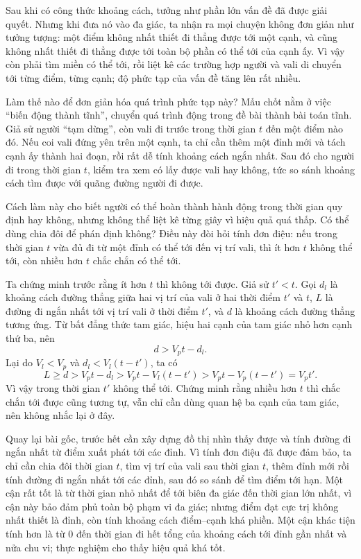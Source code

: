 \documentclass[11pt]{article}
\begin{document}
Sau khi có công thức khoảng cách, tưởng như phần lớn vấn đề đã được giải
quyết. Nhưng khi đưa nó vào đa giác, ta nhận ra mọi chuyện không đơn giản như
tưởng tượng: một điểm không nhất thiết đi thẳng được tới một cạnh, và cũng
không nhất thiết đi thẳng được tới toàn bộ phần có thể tới của cạnh ấy. Vì
vậy còn phải tìm miền có thể tới, rồi liệt kê các trường hợp người và vali di
chuyển tới từng điểm, từng cạnh; độ phức tạp của vấn đề tăng lên rất nhiều.

Làm thế nào để đơn giản hóa quá trình phức tạp này? Mấu chốt nằm ở việc
``biến động thành tĩnh'', chuyển quá trình động trong đề bài thành bài toán
tĩnh. Giả sử người ``tạm dừng'', còn vali đi trước trong thời gian \(t\) đến
một điểm nào đó. Nếu coi vali đứng yên trên một cạnh, ta chỉ cần thêm một đỉnh
mới và tách cạnh ấy thành hai đoạn, rồi rất dễ tính khoảng cách ngắn nhất.
Sau đó cho người đi trong thời gian \(t\), kiểm tra xem có lấy được vali hay
không, tức so sánh khoảng cách tìm được với quãng đường người đi được.

Cách làm này cho biết người có thể hoàn thành hành động trong thời gian quy
định hay không, nhưng không thể liệt kê từng giây vì hiệu quả quá thấp. Có
thể dùng chia đôi để phán định không? Điều này đòi hỏi tính đơn điệu: nếu
trong thời gian \(t\) vừa đủ đi từ một đỉnh có thể tới đến vị trí vali, thì ít
hơn \(t\) không thể tới, còn nhiều hơn \(t\) chắc chắn có thể tới.

Ta chứng minh trước rằng ít hơn \(t\) thì không tới được. Giả sử
\(t'<t\). Gọi \(d_l\) là khoảng cách đường thẳng giữa hai vị trí của vali ở
hai thời điểm \(t'\) và \(t\), \(L\) là đường đi ngắn nhất tới vị trí vali ở
thời điểm \(t'\), và \(d\) là khoảng cách đường thẳng tương ứng. Từ bất đẳng
thức tam giác, hiệu hai cạnh của tam giác nhỏ hơn cạnh thứ ba, nên
\[
  d>V_p t-d_l.
\]
Lại do \(V_l<V_p\) và \(d_l<V_l(t-t')\), ta có
\[
  L\ge d>V_p t-d_l>V_p t-V_l(t-t')>V_p t-V_p(t-t')=V_p t'.
\]
Vì vậy trong thời gian \(t'\) không thể tới. Chứng minh rằng nhiều hơn \(t\)
thì chắc chắn tới được cũng tương tự, vẫn chỉ cần dùng quan hệ ba cạnh của tam
giác, nên không nhắc lại ở đây.

Quay lại bài gốc, trước hết cần xây dựng đồ thị nhìn thấy được và tính đường
đi ngắn nhất từ điểm xuất phát tới các đỉnh. Vì tính đơn điệu đã được đảm bảo,
ta chỉ cần chia đôi thời gian \(t\), tìm vị trí của vali sau thời gian \(t\),
thêm đỉnh mới rồi tính đường đi ngắn nhất tới các đỉnh, sau đó so sánh để tìm
điểm tới hạn. Một cận rất tốt là từ thời gian nhỏ nhất để tới biên đa giác
đến thời gian lớn nhất, vì cận này bảo đảm phủ toàn bộ phạm vi đa giác; nhưng
điểm đạt cực trị không nhất thiết là đỉnh, còn tính khoảng cách điểm--cạnh khá
phiền. Một cận khác tiện tính hơn là từ \(0\) đến thời gian đi hết tổng của
khoảng cách tới đỉnh gần nhất và nửa chu vi; thực nghiệm cho thấy hiệu quả
khá tốt.
\end{document}
